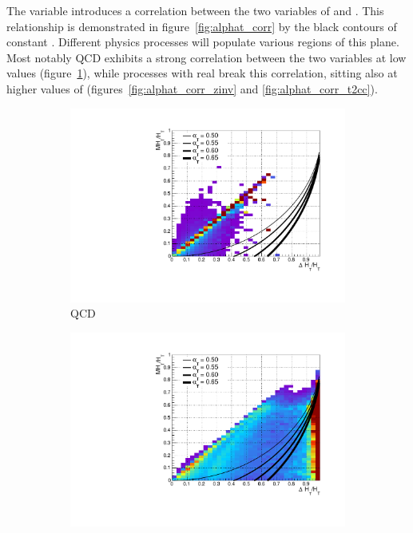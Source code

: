 The \alphat variable introduces a correlation between the two variables of \mht
and \deltaHT. This relationship is demonstrated in figure~\ref{fig:alphat_corr}
by the black contours of constant \alphat. Different physics processes
will populate various regions of this plane. Most notably QCD exhibits a strong
correlation between the two variables at low \alphat values
(figure~\ref{fig:alphat_corr_qcd}), while processes with real \met break this
correlation, sitting also at higher values of \alphat
(figures~\ref{fig:alphat_corr_zinv} and \ref{fig:alphat_corr_t2cc}).

\begin{figure}[h!]
  \centering
  \begin{subfigure}[b]{.46\textwidth}
    \includegraphics[width=\textwidth]{Figs/alphat/alphat_correlation_QCD.pdf}
    \caption{QCD}
    \label{fig:alphat_corr_qcd}
  \end{subfigure}
  \begin{subfigure}[b]{.46\textwidth}
    \includegraphics[width=\textwidth]{Figs/alphat/alphat_correlation_Zinv.pdf}

\end{subfigure}
\end{figure}
